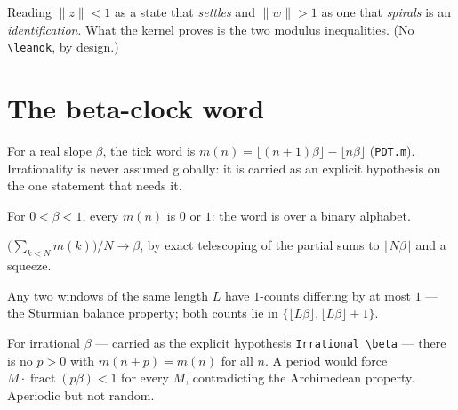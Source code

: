 \begin{assumption}
  \label{ass:settle_spiral}
  Reading $\|z\| < 1$ as a state that \emph{settles} and $\|w\| > 1$ as one that
  \emph{spirals} is an \emph{identification}. What the kernel proves is the two modulus
  inequalities. (No \texttt{\textbackslash leanok}, by design.)
\end{assumption}

\chapter{The beta-clock word}

For a real slope $\beta$, the tick word is $m(n) = \lfloor (n+1)\beta\rfloor - \lfloor
n\beta\rfloor$ (\lstinline{PDT.m}). Irrationality is never assumed globally: it is carried as
an explicit hypothesis on the one statement that needs it.

\begin{theorem}
  \label{thm:clock_two_valued}
  \leanok
  For $0 < \beta < 1$, every $m(n)$ is $0$ or $1$: the word is over a binary alphabet.
\end{theorem}

\begin{theorem}
  \label{thm:clock_density}
  \leanok
  $\bigl(\sum_{k<N} m(k)\bigr)/N \to \beta$, by exact telescoping of the partial sums to
  $\lfloor N\beta\rfloor$ and a squeeze.
\end{theorem}

\begin{theorem}[Balanced]
  \label{thm:clock_balanced}
  \leanok
  Any two windows of the same length $L$ have $1$-counts differing by at most $1$ --- the
  Sturmian balance property; both counts lie in $\{\lfloor L\beta\rfloor, \lfloor
  L\beta\rfloor + 1\}$.
\end{theorem}

\begin{theorem}
  \label{thm:clock_aperiodic}
  \leanok
  For irrational $\beta$ --- carried as the explicit hypothesis
  \lstinline{Irrational \beta} --- there is no $p > 0$ with $m(n+p) = m(n)$ for all $n$. A
  period would force $M\cdot\operatorname{fract}(p\beta) < 1$ for every $M$, contradicting the
  Archimedean property. Aperiodic but not random.
\end{theorem}

